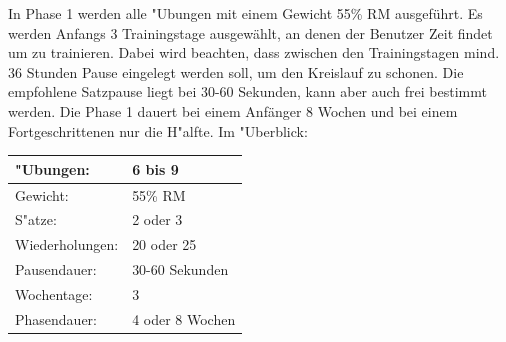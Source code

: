 \documentclass[a4paper,12pt]{article}
\begin{document}
	In Phase 1 werden alle "Ubungen mit einem Gewicht 55\% RM ausgeführt. Es werden Anfangs 3 Trainingstage ausgewählt, an denen der Benutzer Zeit findet um zu trainieren. Dabei wird beachten, dass zwischen den Trainingstagen mind. 36 Stunden Pause eingelegt werden soll, um den Kreislauf zu schonen. Die empfohlene Satzpause liegt bei 30-60 Sekunden, kann aber auch frei bestimmt werden. \newline 
	Die Phase 1 dauert bei einem Anfänger 8 Wochen und bei einem Fortgeschrittenen nur die H"alfte.
	\newline
	Im "Uberblick:
		\begin{center}
			\begin{tabular}{| l | l |}
				\hline
				"Ubungen: & 6 bis 9 \\ \hline 
				Gewicht: & 55\% RM \\ \hline
				S"atze: & 2 oder 3 \\ \hline
				Wiederholungen: & 20 oder 25 \\ \hline
				Pausendauer: & 30-60 Sekunden \\ \hline
				Wochentage: & 3 \\ \hline
				Phasendauer: & 4 oder 8 Wochen \\ \hline
			\end{tabular} \\
		\end{center}
		
	\newpage	
\end{document}
